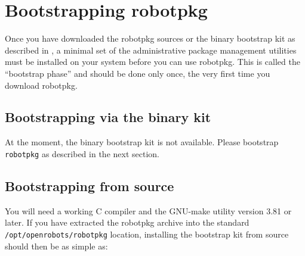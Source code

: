 %
%
%
%
%

\section{Bootstrapping robotpkg} %
\label{section:bootstrapping}

Once you have  downloaded the robotpkg sources  or the binary bootstrap kit  as
described  in  , a minimal
set  of  the administrative package management  utilities  must be installed on
your system  before you  can  use robotpkg.   This  is  called the  ``bootstrap
phase'' and  should   be done only   once,  the very  first  time you  download
robotpkg.


\subsection{Bootstrapping via the binary kit} %

At the moment, the binary bootstrap kit is not available. Please bootstrap {\tt
robotpkg} as described in the next section.


\subsection{Bootstrapping from source} %

You will  need a working C compiler  and the GNU-make   utility version 3.81 or
later.    If you have  extracted  the  robotpkg  archive  into  the standard {\tt
/opt/openrobots/robotpkg} location, installing the   bootstrap kit from  source
should then be as simple as:

